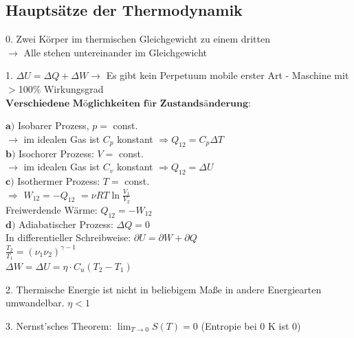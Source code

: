 \documentclass[german]{latex4ei/latex4ei_sheet}
\begin{document}
\begin{sectionbox}
\subsection{Hauptsätze der Thermodynamik}

\begin{cookbox}{}
\item[0.] Zwei Körper im thermischen Gleichgewicht zu einem dritten\\ $\rightarrow$ Alle stehen untereinander im Gleichgewicht\\ 
\item[1.] $\Delta U = \Delta Q + \Delta W \rightarrow $ Es gibt kein Perpetuum mobile erster Art - Maschine mit $>$100\% Wirkungsgrad\\
$\textbf{Verschiedene Möglichkeiten für Zustandsänderung:}$
\begin{sectionbox}
$\textbf{a)}$ Isobarer Prozess, $p =$ const.\\ $\rightarrow$ im idealen Gas ist $C_p$ konstant $\Rightarrow Q_{12} = C_p \Delta T$\\
$\textbf{b)}$ Isochorer Prozess: $V =$ const.\\ $\rightarrow$ im idealen Gas ist $C_v$ konstant $\Rightarrow Q_{12} = \Delta U$\\
$\textbf{c)}$ Isothermer Prozess: $T =$ const.\\ $\Rightarrow$ $W_{12} = -Q_{12}$ %
$ =\nu RT \ln\frac{V_1}{V_2}$
\\Freiwerdende Wärme: $Q_{12} = -W_{12}$\\
$\textbf{d)}$ Adiabatischer Prozess: $\Delta Q = 0$\\
In differentieller Schreibweise: $\partial U = \partial W + \partial Q $\\
$\frac{T_2}{T_1}=({\nu_1}{\nu_2})^{\gamma -1}$\\
$\Delta W = \Delta U = \eta \cdot C_u(T_2-T_1)$
\end{sectionbox}
\item[2.] Thermische Energie ist nicht in beliebigem Maße in andere Energiearten umwandelbar. $\eta < 1$
\item[3.] Nernst'sches Theorem: $\lim_{T \rightarrow 0} S(T) = 0$ (Entropie bei 0 K ist 0)\\
\end{cookbox}
\end{sectionbox}
\end{document}

